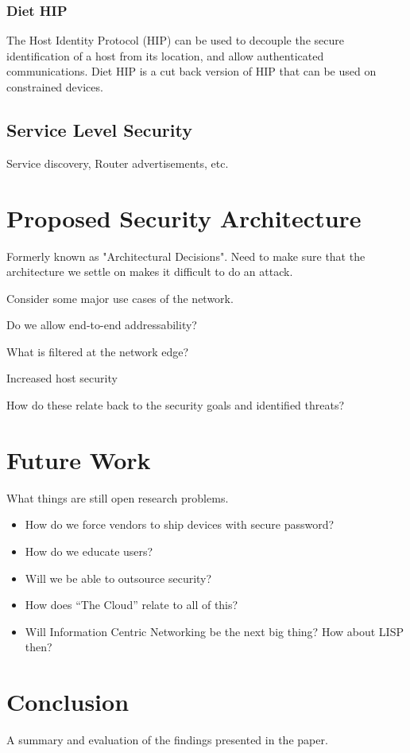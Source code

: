 \documentclass[10pt,journal,compsoc]{IEEEtran}
\begin{document}
\subsubsection{Diet HIP}
The Host Identity Protocol (HIP) can be used to decouple the secure
identification of a host from its location, and allow authenticated
communications. Diet HIP is a cut back version of HIP that can be used on
constrained devices. 

\subsection{Service Level Security}
Service discovery, Router advertisements, etc.

\section{Proposed Security Architecture}
Formerly known as "Architectural Decisions". Need to make sure that the
architecture we settle on makes it difficult to do an attack. 

Consider some major use cases of the network.

Do we allow end-to-end addressability?

What is filtered at the network edge?

Increased host security

How do these relate back to the security goals and identified threats?


\section{Future Work}
What things are still open research problems. 

\begin{itemize}
\item How do we force vendors to ship devices with secure password?
\item How do we educate users?
\item Will we be able to outsource security?
\item How does ``The Cloud'' relate to all of this?
\item Will Information Centric Networking be the next big thing? How about LISP then?
\end{itemize}


\section{Conclusion}
A summary and evaluation of the findings presented in the paper.
\end{document}
